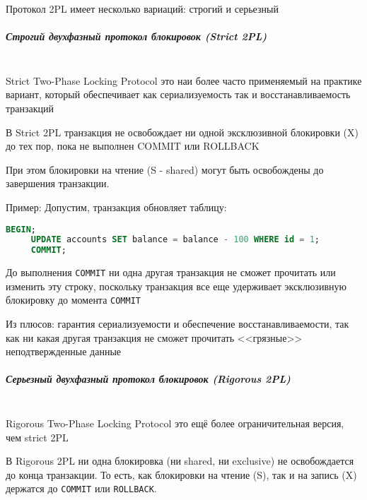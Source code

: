  Протокол 2PL имеет несколько вариаций: строгий и серьезный
 
 \subparagraph{Строгий двухфазный протокол блокировок (Strict 2PL)} ~\\

 Strict Two-Phase Locking Protocol это наи более часто применяемый на практике вариант, который обеспечивает как сериализуемость так и восстанавливаемость транзакций
 
 \begin{grayquote}
     В Strict 2PL транзакция не освобождает ни одной эксклюзивной блокировки (X) до тех пор, пока не выполнен COMMIT или ROLLBACK \autocite{Silberschatz}
 \end{grayquote}
 
 При этом блокировки на чтение (S - shared) могут быть освобождены до завершения транзакции.
 
 Пример:
 Допустим, транзакция обновляет таблицу:
 \begin{lstlisting}[language=SQL]
     BEGIN;
     UPDATE accounts SET balance = balance - 100 WHERE id = 1;
     COMMIT;    
 \end{lstlisting}

 До выполнения \texttt{COMMIT} ни одна другая транзакция не сможет прочитать или изменить эту строку, поскольку транзакция все еще удерживает эксклюзивную блокировку до момента \texttt{COMMIT}
 
 Из плюсов: гарантия сериализуемости и обеспечение восстанавливаемости, так как ни какая другая транзакция не сможет прочитать <<грязные>> неподтвержденные данные
 
 \subparagraph{Серьезный двухфазный протокол блокировок (Rigorous 2PL)} ~\\

 Rigorous Two-Phase Locking Protocol это ещё более ограничительная версия, чем strict 2PL \autocite{Silberschatz}
 \begin{grayquote}
     В Rigorous 2PL ни одна блокировка (ни shared, ни exclusive) не освобождается до конца транзакции. 
     То есть, как блокировки на чтение (S), так и на запись (X) держатся до \texttt{COMMIT} или \texttt{ROLLBACK}. \autocite{Silberschatz}
 \end{grayquote}
 
